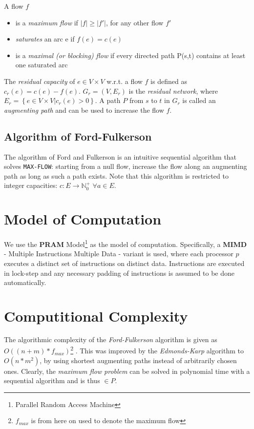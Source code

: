 \documentclass[a4paper,10pt, twocolumn]{article}
\begin{document}
A flow $f$
\begin{itemize}
	\item is a \emph{maximum flow} if $\lvert f\rvert \geq \lvert f'\rvert$, for any other flow $f'$
	\item \emph{saturates} an arc e if $f(e) = c(e)$
	\item is a \emph{maximal (or blocking) flow} if every directed path P(s,t) contains at least one saturated arc
\end{itemize}
\medskip
The \emph{residual capacity} of $e \in V \times V$ w.r.t. a flow $f$ is defined as $c_r(e) = c(e) - f(e)$. $G_r = (V, E_r)$ is the \emph{residual network}, where $E_r = \left\{e \in V \times V \lvert c_r(e) > 0\right\}$. A path $P$ from $s$ to $t$ in $G_r$ is called an \emph{augmenting path} and can be used to increase the flow $f$.

\subsection{Algorithm of Ford-Fulkerson}
\label{sec:fordfulkerson}
The algorithm of Ford and Fulkerson \cite{ahuja93} is an intuitive sequential algorithm that solves \lstinline|MAX-FLOW|: starting from a null flow, increase the flow along an augmenting path as long as such a path exists. Note that this algorithm is restricted to integer capacities:  $c:E\rightarrow \mathbb{N}_0^{+}$ $\forall a \in E$.

\section{Model of Computation}
\label{sec:model}
We use the \textbf{PRAM} Model\footnote{Parallel Random Access Machine} as the model of computation. Specifically, a \textbf{MIMD} - Multiple Instructions Multiple Data - variant is used, where each processor $p$ executes a distinct set of instructions on distinct data. Instructions are executed in lock-step and any necessary padding of instructions is assumed to be done automatically. 

\section{Computitional Complexity}
\label{sec:cc}
The algorithmic complexity of the \emph{Ford-Fulkerson} algorithm is given as $O((n+m)*f_{max})$\footnote{$f_{max}$ is from here on used to denote the maximum flow} \cite{ahuja93,papa95}. This was improved by the \emph{Edmonds-Karp} algorithm to $O(n*m^2)$, by using shortest augmenting paths instead of arbitrarily chosen ones. Clearly, the \emph{maximum flow problem} can be solved in polynomial time with a sequential algorithm and is thus $\in P$.
\end{document}
